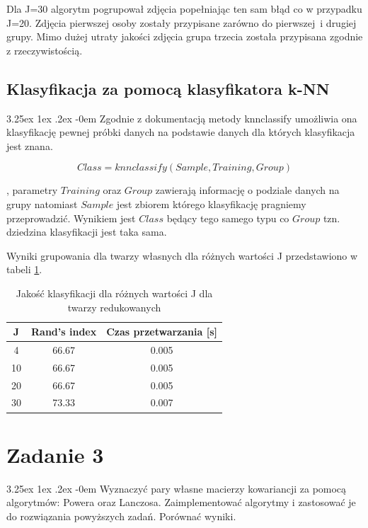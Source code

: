 \documentclass[11pt, a4paper]{article}
\makeatletter
\newcommand{\fbi}{\leavevmode{\parindent=1em\indent}}
\renewcommand\paragraph{\@startsection{paragraph}{5}{\z@}
  {3.25ex \@plus1ex \@minus.2ex}
  {-0em}
  {\normalfont\normalsize\bfseries}}
\makeatother
\begin{document}
\fbi
Dla J=30 algorytm pogrupował zdjęcia popełniając ten sam błąd co w przypadku J=20. Zdjęcia pierwszej osoby zostały przypisane zarówno do pierwszej~i drugiej grupy. Mimo dużej utraty jakości zdjęcia grupa trzecia została przypisana zgodnie z rzeczywistością.

\subsection{Klasyfikacja za pomocą klasyfikatora k-NN}
\paragraph{}
Zgodnie z dokumentacją metody knnclassify \cite{test3} umożliwia ona klasyfikację pewnej próbki danych na podstawie danych dla których klasyfikacja jest znana.

\begin{equation}\label{eq:knnclasify}
Class = knnclassify(Sample, Training, Group)
\end{equation}

, parametry $Training$ oraz $Group$ zawierają informację o podziale danych na grupy natomiast $Sample$ jest zbiorem którego klasyfikację pragniemy przeprowadzić. Wynikiem jest $Class$ będący tego samego typu co $Group$ tzn. dziedzina klasyfikacji jest taka sama.


\fbi
Wyniki grupowania dla twarzy własnych dla różnych wartości J przedstawiono w tabeli \ref{tab:wynikiKlasyfikacjaRedukowane}.

\begin{table}[H]
	\centering
	\caption{Jakość klasyfikacji dla różnych wartości J dla twarzy redukowanych}
	\begin{tabular}{|c|c|c|}
		\hline 
		J & Rand's index & Czas przetwarzania [s] \\ 
		\hline
		4 & 66.67 & 0.005 \\
		\hline
		10 & 66.67 & 0.005 \\
		\hline
		20 & 66.67 & 0.005 \\
		\hline
		30 & 73.33 & 0.007 \\
		\hline
	\end{tabular}
	\label{tab:wynikiKlasyfikacjaRedukowane}
\end{table}


\section{Zadanie 3}
\paragraph{}
Wyznaczyć pary własne macierzy kowariancji za pomocą algorytmów: Powera oraz Lanczosa. Zaimplementować algorytmy i zastosować je do rozwiązania powyższych zadań. Porównać wyniki.
\end{document}
